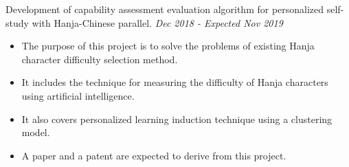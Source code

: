 \documentclass[10pt]{article}
\newenvironment{changemargin}[2]{
  \begin{list}{}{
    \setlength{\topsep}{0pt}
    \setlength{\leftmargin}{#1}
    \setlength{\rightmargin}{#2}
    \setlength{\listparindent}{\parindent}
    \setlength{\itemindent}{\parindent}
    \setlength{\parsep}{\parskip}
  }
  \item[]}{\end{list}
}
\newcommand{\project}[2]{
	{#1} \hfill \emph{#2}\\ \medskip
}
\newenvironment{body} {
	\vspace*{-16pt}
	\begin{changemargin}{-0.25in}{-0.5in}
  }
	{\end{changemargin}
}
\begin{document}
\begin{body}
\project{Development of capability assessment evaluation algorithm for personalized self-study with Hanja-Chinese parallel.}{Dec 2018 - Expected Nov 2019}
\begin{itemize} \itemsep -0pt  %
      \item  The purpose of this project is to solve the problems of existing Hanja character difficulty selection method.
      \item It includes the technique for measuring the difficulty of Hanja characters using artificial intelligence.
      \item It also covers personalized learning induction technique using a clustering model.
      \item A paper and a patent are expected to derive from this project.
  	\end{itemize}
	
\end{body}


\medskip
\end{document}
